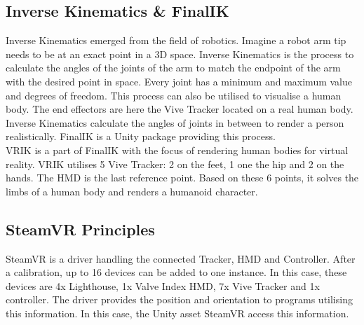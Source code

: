 \subsection{Inverse Kinematics \& FinalIK}
Inverse Kinematics emerged from the field of robotics. Imagine a robot arm tip needs to be at an exact point in a 3D space. Inverse Kinematics is the process to calculate the angles of the joints of the arm to match the endpoint of the arm with the desired point in space. Every joint has a minimum and maximum value and degrees of freedom. This process can also be utilised to visualise a human body. The end effectors are here the Vive Tracker located on a real human body. Inverse Kinematics calculate the angles of joints in between to render a person realistically. FinalIK is a Unity package providing this process.\\
VRIK is a part of FinalIK with the focus of rendering human bodies for virtual reality. VRIK utilises 5 Vive Tracker: 2 on the feet, 1 one the hip and 2 on the hands. The HMD is the last reference point. Based on these 6 points, it solves the limbs of a human body and renders a humanoid character.

\subsection{SteamVR Principles}
SteamVR is a driver handling the connected Tracker, HMD and Controller. After a calibration, up to 16 devices can be added to one instance. In this case, these devices are 4x Lighthouse, 1x Valve Index HMD, 7x Vive Tracker and 1x controller. The driver provides the position and orientation to programs utilising this information. In this case, the Unity asset SteamVR access this information.

